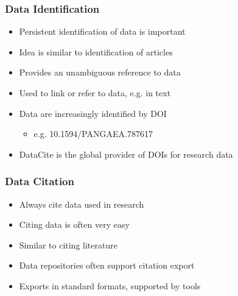 \documentclass{beamer}
\begin{document}
\begin{frame}
  \frametitle{Data Identification}
  
  \begin{itemize}
  \item Persistent identification of data is important
  \item Idea is similar to identification of articles
  \item Provides an unambiguous reference to data
  \item Used to link or refer to data, e.g. in text
  \item Data are increasingly identified by DOI 
  \begin{itemize}
  \item e.g. 10.1594/PANGAEA.787617
  \end{itemize}
  \item DataCite is the global provider of DOIs for research data
  \end{itemize}
\end{frame}

\begin{frame}
  \frametitle{Data Citation}
  
  \begin{itemize}
  \item Always cite data used in research
  \item Citing data is often very easy
  \item Similar to citing literature
  \item Data repositories often support citation export
  \item Exports in standard formats, supported by tools
  \end{itemize}
\end{frame}

{
	\begin{frame}[plain]
	\end{frame}
}
\end{document}

